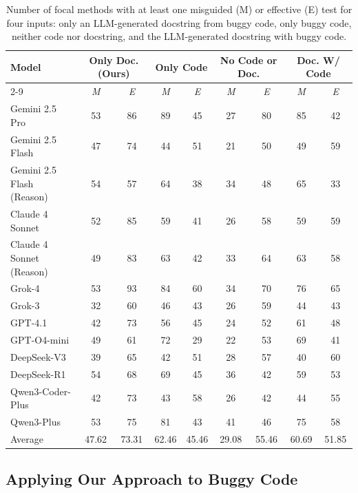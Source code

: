 \documentclass[acmsmall]{acmart}
\begin{document}
\begin{table}[htbp!]
\centering
\tiny
\caption{Number of focal methods with at least one misguided (M) or effective (E) test for four inputs: only an LLM-generated docstring from buggy code, only buggy code, neither code nor docstring, and the LLM-generated docstring with buggy code.}
\vspace{-0.4em}
\label{tab:docstring_improve_method_level}
\begin{tabular}{l|cc|cc|cc|cc}
\toprule
\multirow{2}{*}{\textbf{Model}} & \multicolumn{2}{c|}{\textbf{Only Doc. (Ours)}} & \multicolumn{2}{c|}{\textbf{Only Code}} & \multicolumn{2}{c|}{\textbf{No Code or Doc.}} & \multicolumn{2}{c}{\textbf{Doc. W/ Code}} \\
\cmidrule{2-9}
 & \emph{M} & \emph{E} & \emph{M} & \emph{E} & \emph{M} & \emph{E} & \emph{M} & \emph{E} \\
\midrule
Gemini 2.5 Pro & 53 & 86 & 89 & 45 & 27 & 80 & 85 & 42 \\
Gemini 2.5 Flash & 47 & 74 & 44 & 51 & 21 & 50 & 49 & 59 \\
Gemini 2.5 Flash (Reason) & 54 & 57 & 64 & 38 & 34 & 48 & 65 & 33 \\
Claude 4 Sonnet & 52 & 85 & 59 & 41 & 26 & 58 & 59 & 59 \\
Claude 4 Sonnet (Reason) & 49 & 83 & 63 & 42 & 33 & 64 & 63 & 58 \\
Grok-4 & 53 & 93 & 84 & 60 & 34 & 70 & 76 & 65 \\
Grok-3 & 32 & 60 & 46 & 43 & 26 & 59 & 44 & 43 \\
GPT-4.1 & 42 & 73 & 56 & 45 & 24 & 52 & 61 & 48 \\
GPT-O4-mini & 49 & 61 & 72 & 29 & 22 & 53 & 69 & 41 \\
DeepSeek-V3 & 39 & 65 & 42 & 51 & 28 & 57 & 40 & 60 \\
DeepSeek-R1 & 54 & 68 & 69 & 45 & 36 & 42 & 59 & 53 \\
Qwen3-Coder-Plus & 42 & 73 & 43 & 58 & 26 & 42 & 44 & 55 \\
Qwen3-Plus & 53 & 75 & 81 & 43 & 41 & 46 & 75 & 58 \\
\midrule
Average & 47.62 & 73.31 & 62.46 & 45.46 & 29.08 & 55.46 & 60.69 & 51.85 \\
\bottomrule
\end{tabular}
\vspace{-1.0em}
\end{table}




\subsection{Applying Our Approach to Buggy Code}
\label{subsec:4.1_base_prompt}
\end{document}

